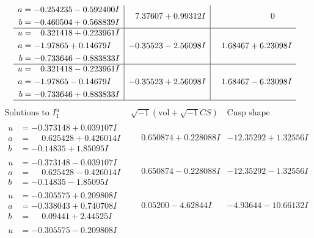 \documentclass[1p]{elsarticle_modified}
\theoremstyle{definition}
\newcommand{\I}{\sqrt{-1}}
\begin{document}
$$\begin{array}{c|c|c}
\begin{aligned}
a &= -0.254235 - 0.592400 I \\
b &= -0.460504 + 0.568839 I\end{aligned}
 & \phantom{-}7.37607 + 0.99312 I & \phantom{-0.000000 } 0 \\ \hline\begin{aligned}
u &= \phantom{-}0.321418 + 0.223961 I \\
a &= -1.97865 + 0.14679 I \\
b &= -0.733646 - 0.883833 I\end{aligned}
 & -0.35523 - 2.56098 I & \phantom{-}1.68467 + 6.23098 I \\ \hline\begin{aligned}
u &= \phantom{-}0.321418 - 0.223961 I \\
a &= -1.97865 - 0.14679 I \\
b &= -0.733646 + 0.883833 I\end{aligned}
 & -0.35523 + 2.56098 I & \phantom{-}1.68467 - 6.23098 I\\
 \hline 
 \end{array}$$\newpage$$\begin{array}{c|c|c}  
\text{Solutions to }I^u_{1}& \I (\text{vol} + \sqrt{-1}CS) & \text{Cusp shape}\\
 \hline 
\begin{aligned}
u &= -0.373148 + 0.039107 I \\
a &= \phantom{-}0.625428 + 0.426014 I \\
b &= -0.14835 + 1.85095 I\end{aligned}
 & \phantom{-}0.650874 + 0.228088 I & -12.35292 + 1.32556 I \\ \hline\begin{aligned}
u &= -0.373148 - 0.039107 I \\
a &= \phantom{-}0.625428 - 0.426014 I \\
b &= -0.14835 - 1.85095 I\end{aligned}
 & \phantom{-}0.650874 - 0.228088 I & -12.35292 - 1.32556 I \\ \hline\begin{aligned}
u &= -0.305575 + 0.209808 I \\
a &= -0.338043 + 0.740708 I \\
b &= \phantom{-}0.09441 + 2.44525 I\end{aligned}
 & \phantom{-}0.05200 - 4.62844 I & -4.93644 - 10.66132 I \\ \hline\begin{aligned}
u &= -0.305575 - 0.209808 I \\

\end{aligned}
\end{array}$$
\end{document}
